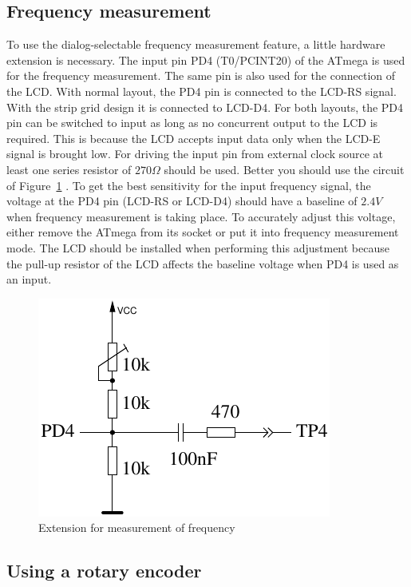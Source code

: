 \subsection{Frequency measurement}
\label{sec:frequency_counter}

To use the dialog-selectable frequency measurement feature, a little hardware extension is necessary.
The input pin PD4 (T0/PCINT20) of the ATmega is used for the frequency measurement.
The same pin is also used for the connection of the LCD. With normal layout, the PD4 pin is connected
to the LCD-RS signal. With the strip grid design it is connected to LCD-D4.
For both layouts, the PD4 pin can be switched to input as long as no concurrent output to the LCD is
required. This is because the LCD accepts input data only when the LCD-E signal is
brought low.
For driving the input pin from external clock source at least one series resistor of \(270\Omega\) should be used.
Better you should use the circuit of Figure~\ref{fig:FreqMes} .
To get the best sensitivity for the input frequency signal, the voltage at the PD4 pin (LCD-RS or LCD-D4) should
have a baseline of \(2.4V\) when frequency measurement is taking place.
To accurately adjust this voltage, either remove the ATmega from its socket
or put it into frequency measurement mode.
The LCD should be installed when performing this adjustment because the pull-up resistor of the LCD affects
the baseline voltage when PD4 is used as an input.

\begin{figure}[H]
\centering
\includegraphics[width=.4\textwidth]{../FIG/Frequency_addon.pdf}
\caption{Extension for measurement of frequency}
\label{fig:FreqMes}
\end{figure}

\subsection{Using a rotary encoder}


